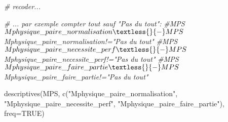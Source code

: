 \documentclass[
]{article}
\newenvironment{Shaded}{\begin{snugshade}}{\end{snugshade}}
\newcommand{\AttributeTok}[1]{\textcolor[rgb]{0.77,0.63,0.00}{#1}}
\newcommand{\CommentTok}[1]{\textcolor[rgb]{0.56,0.35,0.01}{\textit{#1}}}
\newcommand{\ConstantTok}[1]{\textcolor[rgb]{0.00,0.00,0.00}{#1}}
\newcommand{\FunctionTok}[1]{\textcolor[rgb]{0.00,0.00,0.00}{#1}}
\newcommand{\NormalTok}[1]{#1}
\newcommand{\StringTok}[1]{\textcolor[rgb]{0.31,0.60,0.02}{#1}}
\begin{document}
\begin{Shaded}
\begin{Highlighting}[]
\CommentTok{\# recoder... }

\CommentTok{\# ... par exemple compter tout sauf "Pas du tout": }
\CommentTok{\#MPS$Mphysique\_paire\_normalisation  \textless{}{-} MPS$Mphysique\_paire\_normalisation!="Pas du tout"  }
\CommentTok{\#MPS$Mphysique\_paire\_necessite\_perf \textless{}{-} MPS$Mphysique\_paire\_necessite\_perf!="Pas du tout"}
\CommentTok{\#MPS$Mphysique\_paire\_faire\_partie   \textless{}{-} MPS$Mphysique\_paire\_faire\_partie!="Pas du tout"}

\FunctionTok{descriptives}\NormalTok{(MPS, }\FunctionTok{c}\NormalTok{(}\StringTok{"Mphysique\_paire\_normalisation"}\NormalTok{, }
                    \StringTok{"Mphysique\_paire\_necessite\_perf"}\NormalTok{,}
                    \StringTok{"Mphysique\_paire\_faire\_partie"}\NormalTok{),}
             \AttributeTok{freq=}\ConstantTok{TRUE}\NormalTok{)}
\end{Highlighting}
\end{Shaded}
\end{document}
